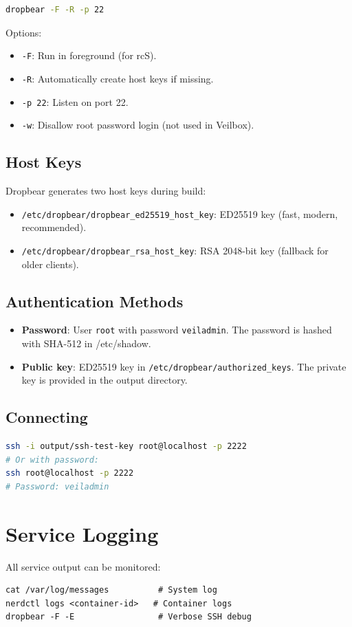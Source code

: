 \begin{lstlisting}[language=bash]
dropbear -F -R -p 22
\end{lstlisting}

Options:
\begin{itemize}[nosep]
  \item \texttt{-F}: Run in foreground (for rcS).
  \item \texttt{-R}: Automatically create host keys if missing.
  \item \texttt{-p 22}: Listen on port 22.
  \item \texttt{-w}: Disallow root password login (not used in Veilbox).
\end{itemize}

\subsection{Host Keys}

Dropbear generates two host keys during build:
\begin{itemize}[nosep]
  \item \texttt{/etc/dropbear/dropbear\_ed25519\_host\_key}: ED25519 key
        (fast, modern, recommended).
  \item \texttt{/etc/dropbear/dropbear\_rsa\_host\_key}: RSA 2048-bit
        key (fallback for older clients).
\end{itemize}

\subsection{Authentication Methods}

\begin{itemize}[nosep]
  \item \textbf{Password}: User \texttt{root} with password \texttt{veiladmin}.
        The password is hashed with SHA-512 in /etc/shadow.
  \item \textbf{Public key}: ED25519 key in
        \texttt{/etc/dropbear/authorized\_keys}. The private key is
        provided in the output directory.
\end{itemize}

\subsection{Connecting}

\begin{lstlisting}[language=bash]
ssh -i output/ssh-test-key root@localhost -p 2222
# Or with password:
ssh root@localhost -p 2222
# Password: veiladmin
\end{lstlisting}

\section{Service Logging}

All service output can be monitored:
\begin{lstlisting}
cat /var/log/messages          # System log
nerdctl logs <container-id>   # Container logs
dropbear -F -E                 # Verbose SSH debug
\end{lstlisting}
